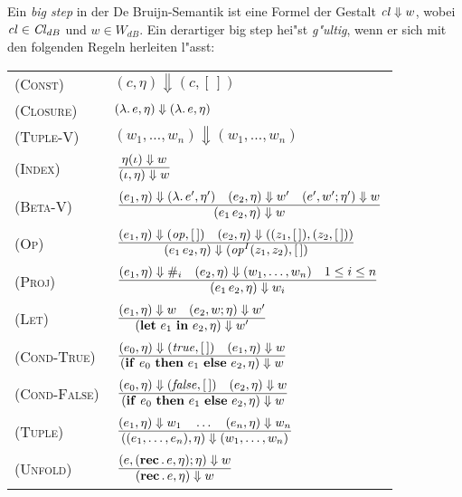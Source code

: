 \documentclass[12pt,fleqn,a4paper]{article}
\newcommand{\RN}[1]{\mbox{\textsc{(#1)}}}
\newcommand{\Cl}{\name{Cl}}
\newcommand{\cl}{\name{cl}}
\begin{document}
\begin{definition}
Ein {\em big step} in der De Bruijn-Semantik ist eine Formel der Gestalt $\cl \Downarrow w$,
wobei $\cl\in\Cl_{dB}$ und $w \in W_{dB}$. Ein derartiger big step hei"st {\em g"ultig}, wenn er
sich mit den folgenden Regeln herleiten l"asst: \\[5mm]
\begin{tabular}{ll}
  \RN{Const}      & $(c,\eta) \Downarrow (c,[\,])$ \\[1mm]
  \RN{Closure}    & $(\lambda .\,e,\eta) \Downarrow (\lambda .\,e,\eta)$ \\[1mm]
  \RN{Tuple-V}    & $(w_1,\ldots,w_n) \Downarrow (w_1,\ldots,w_n)$ \\[1mm]
  \RN{Index}      & $\regel{\eta(\iota) \Downarrow w}
                           {(\iota,\eta) \Downarrow w}$ \\[3mm]
  \RN{Beta-V}     & $\regel{(e_1,\eta) \Downarrow (\abstr{}{e'},\eta')
                            \quad (e_2,\eta) \Downarrow w'
                            \quad (e',w';\eta') \Downarrow w}
                           {(\app{e_1}{e_2},\eta) \Downarrow w}$ \\[3mm]
  \RN{Op}         & $\regel{(e_1,\eta) \Downarrow (\op,[\,]) \quad (e_2,\eta) \Downarrow ((z_1,[\,]),(z_2,[\,]))}
                           {(\app{e_1}{e_2},\eta) \Downarrow (\op^I(z_1,z_2),[\,])}$ \\[3mm]
  \RN{Proj}       & $\regel{(e_1,\eta) \Downarrow \proj{i}
                            \quad (e_2,\eta) \Downarrow (w_1,\ldots,w_n)
                            \quad 1 \le i \le n}
                           {(\app{e_1}{e_2},\eta) \Downarrow w_i}$ \\[3mm]
  \RN{Let}        & $\regel{(e_1,\eta) \Downarrow w \quad (e_2,w;\eta) \Downarrow w'}
                           {(\blidB{e_1}{e_2},\eta) \Downarrow w'}$ \\[3mm]
  \RN{Cond-True}  & $\regel{(e_0,\eta) \Downarrow (\true,[\,]) \quad (e_1,\eta) \Downarrow w}
                           {(\bifte{e_0}{e_1}{e_2},\eta) \Downarrow w}$ \\[3mm]
  \RN{Cond-False} & $\regel{(e_0,\eta) \Downarrow (\false,[\,]) \quad (e_2,\eta) \Downarrow w}
                           {(\bifte{e_0}{e_1}{e_2},\eta) \Downarrow w}$ \\[3mm]
  \RN{Tuple}      & $\regel{(e_1,\eta) \Downarrow w_1 \quad \ldots \quad (e_n,\eta) \Downarrow w_n}
                           {((e_1,\ldots,e_n),\eta) \Downarrow (w_1,\ldots,w_n)}$ \\[3mm]
  \RN{Unfold}     & $\regel{(e,(\rec{}{e},\eta);\eta) \Downarrow w}
                           {(\rec{}{e},\eta) \Downarrow w}$ \\[3mm]
\end{tabular}
\end{definition}
\end{document}
